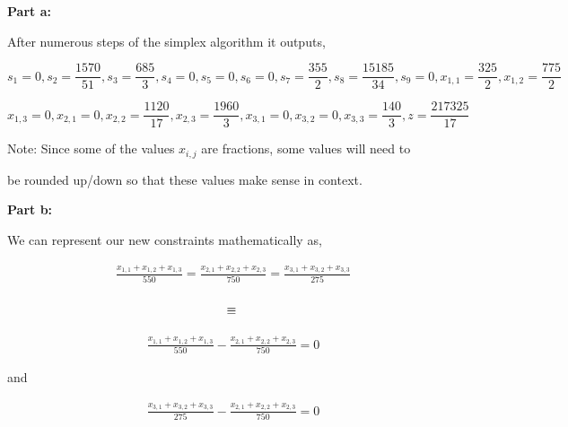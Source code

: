\documentclass{article}
\begin{document}
\vspace{\baselineskip}

\textbf{Part a:}

\vspace{\baselineskip}

After numerous steps of the simplex algorithm it outputs,

\begin{equation*}s_1 = 0, s_2 = \frac{1570}{51}, s_3 = \frac{685}{3}, s_4 = 0, s_5 = 0, s_6 = 0, s_7 = \frac{355}{2}, s_8 = \frac{15185}{34}, s_9 = 0, x_{1,1} = \frac{325}{2}, x_{1,2} = \frac{775}{2}\end{equation*}

\begin{equation*}x_{1,3} = 0, x_{2,1} = 0, x_{2,2} = \frac{1120}{17}, x_{2,3} = \frac{1960}{3}, x_{3,1} = 0, x_{3,2} = 0, x_{3,3} = \frac{140}{3}, z = \frac{217325}{17}
\end{equation*}

\vspace{\baselineskip}

Note: Since some of the values $x_{i,j}$ are fractions, some values will need to 

be rounded up/down so that these values make sense in context.

\vspace{\baselineskip}

\textbf{Part b:}

\vspace{\baselineskip}

We can represent our new  constraints mathematically as,

\begin{align*}
    \frac{x_{1,1} + x_{1,2} + x_{1,3}}{550} = \frac{x_{2,1} + x_{2,2} + x_{2,3}}{750} = \frac{x_{3,1} + x_{3,2} + x_{3,3}}{275}\\
\end{align*}


\[
\equiv\\
\]

\begin{align*}
    \frac{x_{1,1} + x_{1,2} + x_{1,3}}{550} - \frac{x_{2,1} + x_{2,2} + x_{2,3}}{750} = 0
\end{align*}

and

\begin{align*}
\frac{x_{3,1} + x_{3,2} + x_{3,3}}{275} - \frac{x_{2,1} + x_{2,2} + x_{2,3}}{750} = 0
\end{align*}
\end{document}
